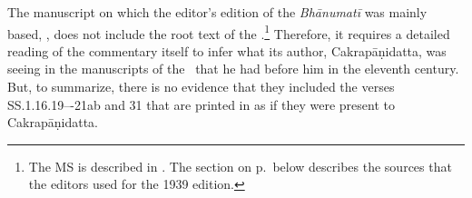 The manuscript on which the editor's edition of the \emph{Bhānumatī} was
mainly based,  , does not include the root text of 
the \SS.\footnote{%
The MS is described in \cite[vol.\,1.5, 928, \#2647]{egge-1887}. 
The section on p.\,\pageref{1939edition} below describes the sources that the editors used 
for the 1939 edition.}  Therefore, it requires a detailed reading  of the commentary itself to 
infer what its author, Cakrapāṇidatta, was seeing in the manuscripts of the \SS\ that he had 
before him in the eleventh century.  But, to summarize, there is no evidence that they  
included the verses SS.1.16.19–-21ab and 31 that are printed in \cite{acar-1939} as if they 
were present to Cakrapāṇidatta. 




 

